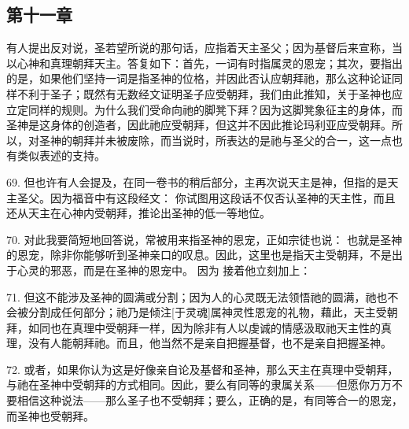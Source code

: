 
\subsection{第十一章}

有人提出反对说，圣若望所说的那句话，应指着天主圣父；因为基督后来宣称，当以心神和真理朝拜天主。答复如下：首先，一词有时指属灵的恩宠；其次，要指出的是，如果他们坚持一词是指圣神的位格，并因此否认应朝拜祂，那么这种论证同样不利于圣子；既然有无数经文证明圣子应受朝拜，我们由此推知，关于圣神也应立定同样的规则。为什么我们受命向祂的脚凳下拜？因为这脚凳象征主的身体，而圣神是这身体的创造者，因此祂应受朝拜，但这并不因此推论玛利亚应受朝拜。所以，对圣神的朝拜并未被废除，而当说时，所表达的是祂与圣父的合一，这一点也有类似表述的支持。\par

69. 但也许有人会提及，在同一卷书的稍后部分，主再次说天主是神，但指的是天主圣父。因为福音中有这段经文：  你试图用这段话不仅否认圣神的天主性，而且还从天主在心神内受朝拜，推论出圣神的低一等地位。\par

70. 对此我要简短地回答说，常被用来指圣神的恩宠，正如宗徒也说：  也就是圣神的恩宠，除非你能够听到圣神亲口的叹息。因此，这里也是指天主受朝拜，不是出于心灵的邪恶，而是在圣神的恩宠中。  因为   接着他立刻加上： \par

71. 但这不能涉及圣神的圆满或分割；因为人的心灵既无法领悟祂的圆满，祂也不会被分割成任何部分；祂乃是倾注[于灵魂]属神灵性恩宠的礼物，藉此，天主受朝拜，如同也在真理中受朝拜一样，因为除非有人以虔诚的情感汲取祂天主性的真理，没有人能朝拜祂。而且，他当然不是亲自把握基督，也不是亲自把握圣神。\par

72. 或者，如果你认为这是好像亲自论及基督和圣神，那么天主在真理中受朝拜，与祂在圣神中受朝拜的方式相同。因此，要么有同等的隶属关系——但愿你万万不要相信这种说法——那么圣子也不受朝拜；要么，正确的是，有同等合一的恩宠，而圣神也受朝拜。\par

